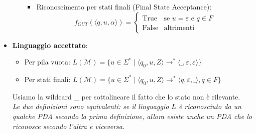 \documentclass[12pt, a4paper]{report}
\begin{document}
\begin{itemize}
\begin{itemize}
\begin{itemize}
\begin{equation*}
                        \end{equation*}
                        \item Riconoscimento per stati finali (Final State Acceptance): \begin{equation*}
                            f_{OUT}(\langle q, u, \alpha \rangle) = \begin{cases} \text{True} & \text{se } u = \varepsilon \text{ e } q \in F \\ \text{False} & \text{altrimenti} \end{cases}
                        \end{equation*}
                    \end{itemize}
                \end{itemize}
                \item \textbf{Linguaggio accettato}: \begin{itemize}
                    \item Per pila vuota: $L(\mathcal{M})=\{u\in\Sigma^*\mid\langle q_0,u,Z\rangle\to^*\langle\_,\varepsilon,\varepsilon\rangle\}$
                    \item Per stati finali: $L(\mathcal{M})=\{u\in\Sigma^*\mid\langle q_0,u,Z\rangle\to^*\langle q,\varepsilon,\_\rangle,q\in F\}$
                \end{itemize}
                Usiamo la wildcard \_ per sottolineare il fatto che lo stato non è rilevante.\\
                \textit{Le due definizioni sono equivalenti: se il linguaggio $L$ è riconosciuto da un qualche PDA secondo la prima definizione, allora esiste anche un PDA che lo riconosce secondo l'altra e viceversa}.
            \end{itemize}
\end{document}

